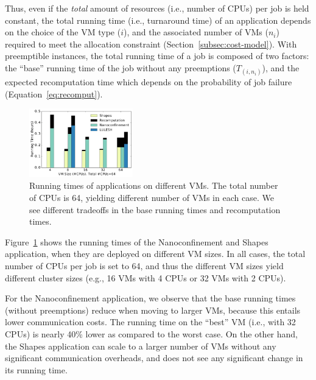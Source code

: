 Thus, even if the \emph{total} amount of resources (i.e., number of CPUs) per job is held constant, the total running time (i.e., turnaround time) of an application depends on the choice of the VM type ($i$), and the associated number of VMs ($n_i$) required to meet the allocation constraint (Section~\ref{subsec:cost-model}).
%
With preemptible instances, the total running time of a job is composed of two factors: the ``base'' running time of the job without any preemptions ($T_{(i,n_i)}$), and the expected recomputation time which depends on the probability of job failure (Equation~\ref{eq:recomput}). 

\begin{figure}
  \centering
  \includegraphics[width=0.4\textwidth]{../graphs/runtime-bars.pdf}
      \vspace*{\myfigspace}
  \caption{Running times of applications on different VMs. The total number of CPUs is 64, yielding different number of VMs in each case. We see different tradeoffs in the base running times and recomputation times.}
  \label{fig:runtimes-bar}
    \vspace*{\myfigspace}
\end{figure}


Figure~\ref{fig:runtimes-bar} shows the running times of the Nanoconfinement and Shapes application, when they are deployed on different VM sizes.
In all cases, the total number of CPUs per job is set to 64, and thus the different VM sizes yield different cluster sizes (e.g., 16 VMs with 4 CPUs or 32 VMs with 2 CPUs).


For the Nanoconfinement application, we observe that the base running times (without preemptions) reduce when moving to larger VMs, because this entails lower communication costs.
The running time on the ``best'' VM (i.e., with 32 CPUs) is nearly 40\% lower as compared to the worst case. 
On the other hand, the Shapes application can scale to a larger number of VMs without any significant communication overheads, and does not see any significant change in its running time.

